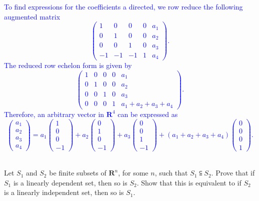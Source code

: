 \documentclass[a4paper,11pt]{article}
\newcommand{\R}{\mathbf{R}}
\newcommand{\BB}[1]{\textcolor{blue}{#1}}
\begin{document}
\BB{To find expressions for the coefficients a directed, we row reduce the
  following augmented matrix
  \[
    \left(
      \begin{array}{rrrr|r}
        1 & 0 & 0 & 0 & a_1 \\
        0 & 1 & 0 & 0 & a_2 \\
        0 & 0 & 1 & 0 & a_3 \\
        -1 & -1 & -1 & 1 & a_4
      \end{array}
    \right).
  \]
  The reduced row echelon form is given by
  \[
    \left(\begin{array}{rrrr|r}
            1 & 0 & 0 & 0 & a_1 \\
            0 & 1 & 0 & 0 & a_2 \\
            0 & 0 & 1 & 0 & a_3 \\
            0 & 0 & 0 & 1 & a_1 + a_2 + a_3 + a_4
          \end{array}\right).
  \]
  Therefore, an arbitrary vector in $\R^4$ can be expressed as
  \[
    \left( \begin{array}{r}a_1\\a_2\\a_3\\a_4\end{array} \right)
    =a_1\left( \begin{array}{r}1\\0\\0\\-1\end{array} \right)
    +a_2\left( \begin{array}{r}0\\1\\0\\-1\end{array} \right)
    +a_3\left( \begin{array}{r}0\\0\\1\\-1\end{array} \right)
    +(a_1+a_2+a_3+a_4)\left( \begin{array}{r}0\\0\\0\\1\end{array} \right).
  \] \\
}

 Let $S_1$ and $S_2$ be finite subsets of $\R^n$,
for some $n$, such that $S_1 \subseteqq S_2$. Prove that if $S_1$ is a linearly
dependent set, then so is $S_2$. Show that this is equivalent to if $S_2$ is a
linearly independent set, then so is $S_1$. \\
\end{document}
